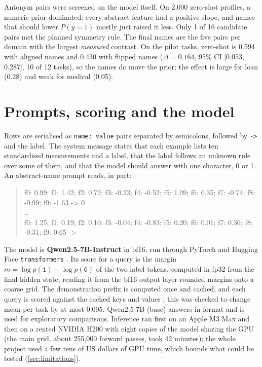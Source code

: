 Antonym pairs were screened on the model itself.
On 2,000 zero-shot profiles, a numeric prior dominated: every abstract feature had a positive slope, and names that should lower $P(y = 1)$ mostly just raised it less.
Only 1 of 16 candidate pairs met the planned symmetry rule.
The final names are the five pairs per domain with the largest \emph{measured} contrast.
On the pilot tasks, zero-shot \AUROC is 0.594 with aligned names and 0.430 with flipped names ($\Delta = 0.164$, 95\% CI [0.053, 0.287], 10 of 12 tasks), so the names do move the prior; the effect is large for loan (0.28) and weak for medical (0.05).

\section{Prompts, scoring and the model}
\label{sec:prompts}

Rows are serialised as \texttt{name: value} pairs separated by semicolons, followed by \texttt{->} and the label.
The system message states that each example lists ten standardised measurements and a label, that the label follows an unknown rule over some of them, and that the model should answer with one character, 0 or 1.
An abstract-name prompt reads, in part:

\begin{quote}\small\ttfamily
f0: 0.99; f1: 1.42; f2: 0.72; f3: -0.23; f4: -0.52; f5: 1.09; f6: 0.35; f7: -0.74; f8: -0.99; f9: -1.63 -> 0\\
\ldots\\
f0: 1.25; f1: 0.19; f2: 0.10; f3: -0.04; f4: -0.83; f5: 0.20; f6: 0.01; f7: 0.36; f8: -0.31; f9: 0.65 ->
\end{quote}

The model is \textbf{Qwen2.5-7B-Instruct} \citep{qwen2024qwen25} in bf16, run through PyTorch and Hugging Face \texttt{transformers} \citep{paszke2019pytorch,wolf2020transformers}.
Its score for a query is the margin $m = \log p(\texttt{1}) - \log p(\texttt{0})$ of the two label tokens, computed in fp32 from the final hidden state; reading it from the bf16 output layer rounded margins onto a coarse grid.
The demonstration prefix is computed once and cached, and each query is scored against the cached keys and values \citep{pope2023efficiently,gim2024prompt}; this was checked to change mean per-task \AUROC by at most 0.005.
Qwen2.5-7B (base) answers in format and is used for exploratory comparisons. Inference ran first on an Apple M3 Max and then on a rented NVIDIA H200 with eight copies of the model sharing the GPU (the main grid, about 255,000 forward passes, took 42 minutes); the whole project used a few tens of US dollars of GPU time, which bounds what could be tested (\autoref{sec:limitations}).

